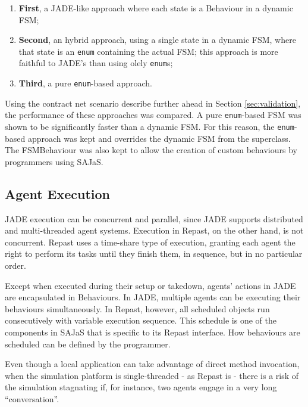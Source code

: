 \documentclass[a4paper,twoside]{article}
\begin{document}
\begin{enumerate}
	\item \textbf{First}, a JADE-like approach where each state is a Behaviour in a dynamic FSM;
	\item \textbf{Second}, an hybrid approach, using a single state in a dynamic FSM, where that state is an \texttt{enum} containing the actual FSM; this approach is more faithful to JADE's than using olely \texttt{enum}s;
	\item \textbf{Third}, a pure \texttt{enum}-based approach.
\end{enumerate}

Using the contract net scenario describe further ahead in Section \ref{sec:validation}, the performance of these approaches was compared. A pure \texttt{enum}-based FSM was shown to be significantly faster than a dynamic FSM. For this reason, the \texttt{enum}-based approach was kept and overrides the dynamic FSM from the superclass. The FSMBehaviour was also kept to allow the creation of custom behaviours by programmers using SAJaS.

\subsection{Agent Execution}
\label{sec:Agent-Execution}

JADE execution can be concurrent and parallel, since JADE supports distributed and multi-threaded agent systems. Execution in Repast, on the other hand, is not concurrent. Repast uses a time-share type of execution, granting each agent the right to perform its tasks until they finish them, in sequence, but in no particular order.

Except when executed during their setup or takedown, agents' actions in JADE are encapsulated in Behaviours. In JADE, multiple agents can be executing their behaviours simultaneously. In Repast, however, all scheduled objects run consecutively with variable execution sequence. This schedule is one of the components in SAJaS that is specific to its Repast interface. How behaviours are scheduled can be defined by the programmer.

Even though a local application can take advantage of direct method invocation, when the simulation platform is single-threaded - as Repast is - there is a risk of the simulation stagnating if, for instance, two agents engage in a very long ``conversation''.
\end{document}
